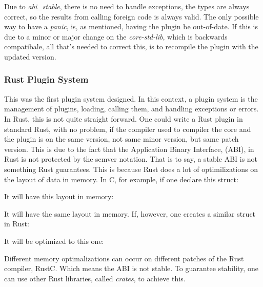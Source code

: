\documentclass[runningheads]{llncs}
\begin{document}

Due to \textit{abi_stable}, there is no need to handle exceptions, the types are
always correct, so the results from calling foreign code is always valid. The
only possible way to have a \textit{panic}, is, as mentioned, having the plugin
be out-of-date. If this is due to a minor or major change on the
\textit{core-std-lib}, which is backwards compatibale, all that's needed to
correct this, is to recompile the plugin with the updated version.

\subsubsection{Rust Plugin System}
This was the first plugin system designed. In this context, a plugin system is
the management of plugins, loading, calling them, and handling exceptions or
errors. In Rust, this is not quite straight forward. One could write a Rust
plugin in standard Rust, with no problem, if the compiler used to compiler the
core and the plugin is on the same version, not same minor version, but same
patch version. %
This is due to the fact that the Application Binary Interface, (ABI), in Rust
is not protected by the semver notation. That is to say, a stable ABI is not
something Rust guarantees.
This is because Rust does a lot of optimilizations on the layout of data in
memory. In C, for example, if one declare this struct:

It will have this layout in memory:


It will have the same layout in memory. If, however, one creates a similar
struct in Rust:

It will be optimized to this one:


Different memory optimalizations can occur on different patches of the Rust
compiler, RustC. Which means the ABI is not stable. To guarantee stability, one
can use other Rust libraries, called \textit{crates}, to achieve this.
\end{document}
